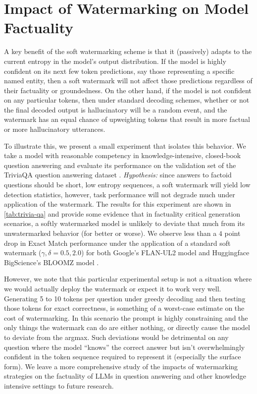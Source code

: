 \documentclass{article}
\theoremstyle{plain}
\theoremstyle{definition}
\theoremstyle{remark}
\begin{document}
\section{Impact of Watermarking on Model Factuality}\label{sec:factuality}

A key benefit of the soft watermarking scheme is that it (passively) adapts to the current entropy in the model's output distribution. If the model is highly confident on its next few token predictions, say those representing a specific named entity, then a soft watermark will not affect those predictions regardless of their factuality or groundedness. On the other hand, if the model is not confident on any particular tokens, then under standard decoding schemes, whether or not the final decoded output is hallucinatory will be a random event, and the watermark has an equal chance of upweighting tokens that result in more factual or more hallucinatory utterances.

To illustrate this, we present a small experiment that isolates this behavior. We take a model with reasonable competency in knowledge-intensive, closed-book question answering and evaluate its performance on the validation set of the TriviaQA question answering dataset \citep{JoshiTriviaQA2017}. \textit{Hypothesis:} since answers to factoid questions should be short, low entropy sequences, a soft watermark will yield low detection statistics, however, task performance will not degrade much under application of the watermark. The results for this experiment are shown in \cref{tab:trivia-qa} and provide some evidence that in factuality critical generation scenarios, a softly watermarked model is unlikely to deviate that much from its unwatermarked behavior (for better or worse). We observe less than a $4$ point drop in Exact Match performance under the application of a standard soft watermark ($\gamma,\delta=0.5,2.0$) for both Google's FLAN-UL2 model \citep{tay2022unifying} and Huggingface BigScience's BLOOMZ model \citep{muennighoff2022crosslingual}.

However, we note that this particular experimental setup is not a situation where we would actually deploy the watermark or expect it to work very well. Generating 5 to 10 tokens per question under greedy decoding and then testing those tokens for exact correctness, is something of a worst-case estimate on the cost of watermarking. In this scenario the prompt is highly constraining and the only things the watermark can do are either nothing, or directly cause the model to deviate from the argmax. Such deviations would be detrimental on any question where the model ``knows'' the correct answer but isn't overwhelmingly confident in the token sequence required to represent it (especially the surface form). We leave a more comprehensive study of the impacts of watermarking strategies on the factuality of LLMs in question answering and other knowledge intensive settings to future research.


\label{lastpageapp}
\end{document}
